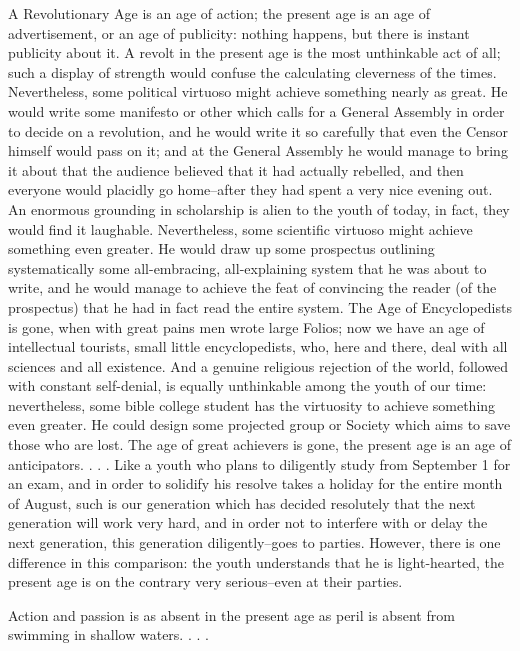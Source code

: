 \documentclass[12pt]{article}
\begin{document}
   A Revolutionary Age is an age of action; the present age is an age of
advertisement, or an age of publicity: nothing happens, but there is instant
publicity about it. A revolt in the present age is the most unthinkable act
of all; such a display of strength would confuse the calculating cleverness
of the times. Nevertheless, some political virtuoso might achieve something
nearly as great. He would write some manifesto or other which calls for a
General Assembly in order to decide on a revolution, and he would write it
so carefully that even the Censor himself would pass on it; and at the
General Assembly he would manage to bring it about that the audience
believed that it had actually rebelled, and then everyone would placidly go
home--after they had spent a very nice evening out. An enormous grounding in
scholarship is alien to the youth of today, in fact, they would find it
laughable. Nevertheless, some scientific virtuoso might achieve something
even greater. He would draw up some prospectus outlining systematically some
all-embracing, all-explaining system that he was about to write, and he
would manage to achieve the feat of convincing the reader (of the
prospectus) that he had in fact read the entire system. The Age of
Encyclopedists is gone, when with great pains men wrote large Folios; now we
have an age of intellectual tourists, small little encyclopedists, who, here
and there, deal with all sciences and all existence. And a genuine religious
rejection of the world, followed with constant self-denial, is equally
unthinkable among the youth of our time: nevertheless, some bible college
student has the virtuosity to achieve something even greater. He could
design some projected group or Society which aims to save those who are
lost. The age of great achievers is gone, the present age is an age of
anticipators. . . . Like a youth who plans to diligently study from
September 1 for an exam, and in order to solidify his resolve takes a
holiday for the entire month of August, such is our generation which has
decided resolutely that the next generation will work very hard, and in
order not to interfere with or delay the next generation, this generation
diligently--goes to parties. However, there is one difference in this
comparison: the youth understands that he is light-hearted, the present age
is on the contrary very serious--even at their parties.

   Action and passion is as absent in the present age as peril is absent
from swimming in shallow waters. . . .
\end{document}
